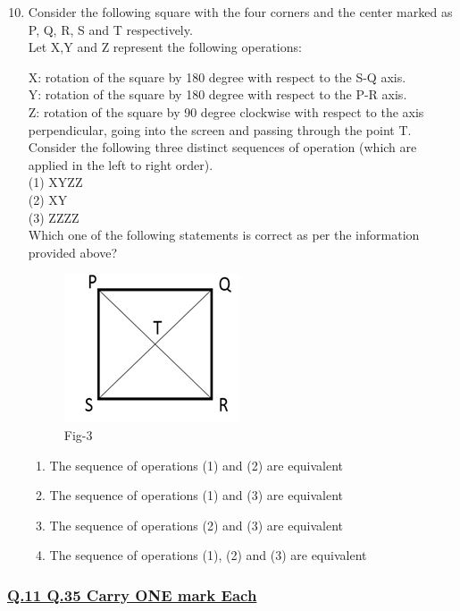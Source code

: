\documentclass[journal]{IEEEtran}
\theoremstyle{remark}
\begin{document}
\begin{enumerate}[itemsep=1em]
\setcounter{enumi}{9}
\item Consider the following square with the four corners and the center marked as P, Q, R, S and T respectively. \\
Let X,Y and Z represent the following operations: 

X: rotation of the square by 180 degree with respect to the 
S-Q axis.  \\
Y: rotation of the square by 180 degree with respect to the P-R axis.  \\
Z: rotation of the square by 90 degree clockwise with respect to the axis \;perpendicular, going into the screen and passing through the point T. \\
Consider the following three distinct sequences of operation (which are applied in the left to right order).\\ 
(1) XYZZ\\ 
(2) XY \\
(3) ZZZZ \\
Which one of the following statements is correct as per the information provided above?  
\begin{figure}[H]
    \centering
    \includegraphics[width=0.2\columnwidth]{figs/fig-3.jpeg}
    \caption*{Fig-3}
    \label{fig-3}
\end{figure}

\begin{enumerate}[leftmargin=2.5em, labelsep=0.5em, itemsep=0.5em]
    \item The sequence of operations (1) and (2) are equivalent 
    \item The sequence of operations (1) and (3) are equivalent 
    \item The sequence of operations (2) and (3) are equivalent
    \item The sequence of operations (1), (2) and (3) are equivalent 
\end{enumerate}
\end{enumerate}
\newpage
\vspace*{0.25cm}
\subsubsection{\underline{Q.11 \text{-} Q.35 Carry ONE mark Each}}
\end{document}
